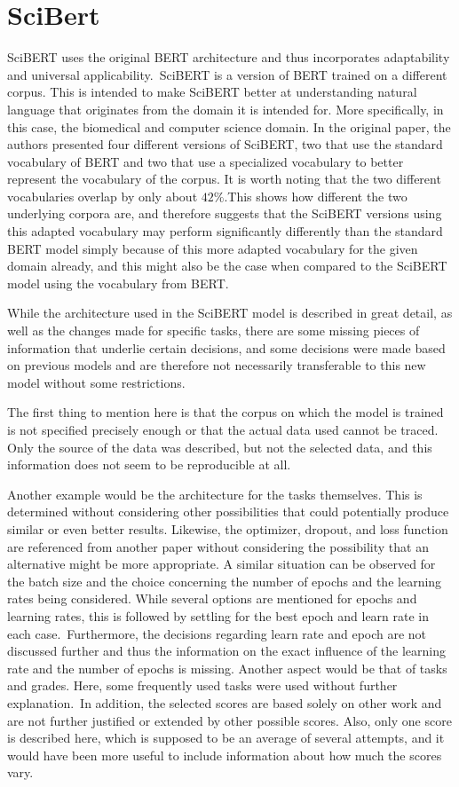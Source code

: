 \chapter{SciBert}
SciBERT uses the original BERT architecture and thus incorporates adaptability and universal applicability. SciBERT is a version of BERT trained on a different corpus. This is intended to make SciBERT better at understanding natural language that originates from the domain it is intended for. More specifically, in this case, the biomedical and computer science domain. In the original paper, the authors presented four different versions of SciBERT, two that use the standard vocabulary of BERT and two that use a specialized vocabulary to better represent the vocabulary of the corpus. It is worth noting that the two different vocabularies overlap by only about $42\%$.This shows how different the two underlying corpora are, and therefore suggests that the SciBERT versions using this adapted vocabulary may perform significantly differently than the standard BERT model simply because of this more adapted vocabulary for the given domain already, and this might also be the case when compared to the SciBERT model using the vocabulary from BERT. 

While the architecture used in the SciBERT model is described in great detail, as well as the changes made for specific tasks, there are some missing pieces of information that underlie certain decisions, and some decisions were made based on previous models and are therefore not necessarily transferable to this new model without some restrictions.

The first thing to mention here is that the corpus on which the model is trained is not specified precisely enough or that the actual data used cannot be traced.  Only the source of the data was described, but not the selected data, and this information does not seem to be reproducible at all.

Another example would be the architecture for the tasks themselves. This is determined without considering other possibilities that could potentially produce similar or even better results. Likewise, the optimizer, dropout, and loss function are referenced from another paper without considering the possibility that an alternative might be more appropriate. A similar situation can be observed for the batch size and the choice concerning the number of epochs and the learning rates being considered. While several options are mentioned for epochs and learning rates, this is followed by settling for the best epoch and learn rate in each case. Furthermore, the decisions regarding learn rate and epoch are not discussed further and thus the information on the exact influence of the learning rate and the number of epochs is missing.
Another aspect would be that of tasks and grades. Here, some frequently used tasks were used without further explanation. In addition, the selected scores are based solely on other work and are not further justified or extended by other possible scores. Also, only one score is described here, which is supposed to be an average of several attempts, and it would have been more useful to include information about how much the scores vary.  


